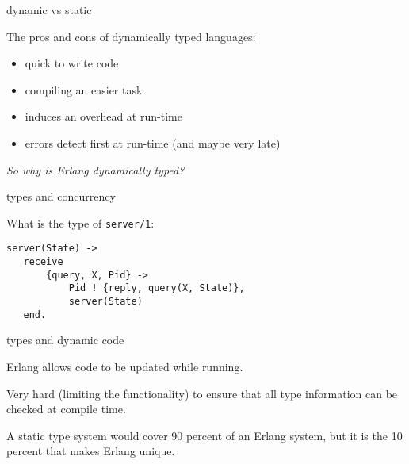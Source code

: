 \begin{frame}{dynamic vs static}

The pros and cons of dynamically typed languages:

\begin{itemize}
\item quick to write code
\item compiling an easier task
\item induces an overhead at run-time
\item errors detect first at run-time (and maybe very late)
\end{itemize}

{\em So why is Erlang dynamically typed?}

\end{frame}

\begin{frame}[fragile]{types and concurrency}

What is the type of {\tt server/1}:

\begin{verbatim}
server(State) ->
   receive 
       {query, X, Pid} ->
           Pid ! {reply, query(X, State)},
           server(State)
   end.
\end{verbatim}

\end{frame}

\begin{frame}[fragile]{types and dynamic code}

Erlang allows code to be updated while running.

\pause\vspace{10pt}

Very hard (limiting the functionality) to ensure that all type
information can be checked at compile time.

\pause\vspace{10pt}

A static type system would cover 90 percent of an Erlang system, but
it is the 10 percent that makes Erlang unique.

\end{frame}

